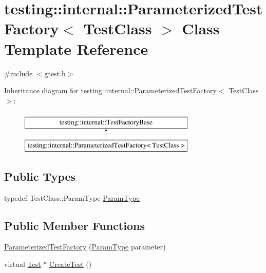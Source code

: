 \hypertarget{classtesting_1_1internal_1_1_parameterized_test_factory}{\section{testing\-:\-:internal\-:\-:Parameterized\-Test\-Factory$<$ Test\-Class $>$ Class Template Reference}
\label{classtesting_1_1internal_1_1_parameterized_test_factory}
}


{\ttfamily \#include $<$gtest.\-h$>$}

Inheritance diagram for testing\-:\-:internal\-:\-:Parameterized\-Test\-Factory$<$ Test\-Class $>$\-:\begin{figure}[H]
\begin{center}
\leavevmode
\includegraphics[height=2.000000cm]{classtesting_1_1internal_1_1_parameterized_test_factory}
\end{center}
\end{figure}
\subsection*{Public Types}
\begin{DoxyCompactItemize}
\item 
typedef Test\-Class\-::\-Param\-Type \hyperlink{classtesting_1_1internal_1_1_parameterized_test_factory_ad9a27b8e1a83de2f1687625bccff460d}{Param\-Type}
\end{DoxyCompactItemize}
\subsection*{Public Member Functions}
\begin{DoxyCompactItemize}
\item 
\hyperlink{classtesting_1_1internal_1_1_parameterized_test_factory_a82d78356cd402224255edec760a048fb}{Parameterized\-Test\-Factory} (\hyperlink{classtesting_1_1internal_1_1_parameterized_test_factory_ad9a27b8e1a83de2f1687625bccff460d}{Param\-Type} parameter)
\item 
virtual \hyperlink{classtesting_1_1_test}{Test} $\ast$ \hyperlink{classtesting_1_1internal_1_1_parameterized_test_factory_ae17e73e91f7fd5d49ca238c005ef4960}{Create\-Test} ()
\end{DoxyCompactItemize}
